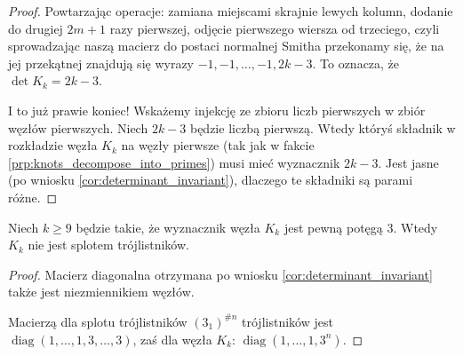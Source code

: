 \begin{proof}
    Powtarzając operacje: zamiana miejscami skrajnie lewych kolumn, dodanie do drugiej $2m+1$ razy pierwszej, odjęcie pierwszego wiersza od trzeciego, czyli sprowadzając naszą macierz do postaci normalnej Smitha przekonamy się, że na jej przekątnej znajdują się wyrazy $-1, -1, \ldots, -1, 2k-3$.
    To oznacza, że $\det K_k = 2k-3$.

    I to już prawie koniec!
    Wskażemy injekcję ze zbioru liczb pierwszych w zbiór węzłów pierwszych.
    Niech $2k-3$ będzie liczbą pierwszą.
    Wtedy któryś składnik w rozkładzie węzła $K_k$ na węzły pierwsze (tak jak w fakcie \ref{prp:knots_decompose_into_primes}) musi mieć wyznacznik $2k-3$.
    Jest jasne (po wniosku \ref{cor:determinant_invariant}), dlaczego te składniki są parami różne.
\end{proof}

\begin{proposition}
    Niech $k \ge 9$ będzie takie, że wyznacznik węzła $K_k$ jest pewną potęgą $3$.
    Wtedy $K_k$ nie jest splotem trójlistników.
\end{proposition}

\begin{proof}
    Macierz diagonalna otrzymana po wniosku \ref{cor:determinant_invariant} także jest niezmiennikiem węzłów.

    Macierzą dla splotu trójlistników $(3_1)^{\# n}$ trójlistników jest $\operatorname{diag}(1, \ldots, 1, 3, \ldots, 3)$, zaś dla węzła $K_k$: $\operatorname{diag} (1, \ldots, 1, 3^n)$.
\end{proof}

%


